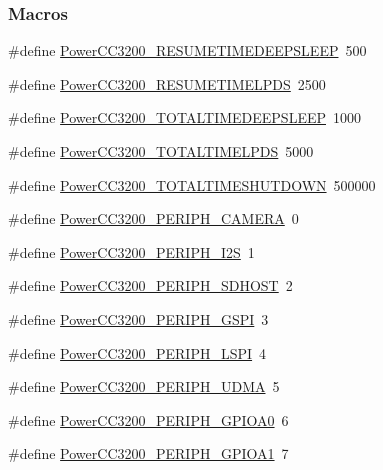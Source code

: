 \subsubsection*{Macros}
\begin{DoxyCompactItemize}
\item 
\#define \hyperlink{_power_c_c3200_8h_af67fc285dc9efcca6002ce2b002f392c}{Power\+C\+C3200\+\_\+\+R\+E\+S\+U\+M\+E\+T\+I\+M\+E\+D\+E\+E\+P\+S\+L\+E\+E\+P}~500
\item 
\#define \hyperlink{_power_c_c3200_8h_aa033c14a63825d7442fc5fbcd83795ac}{Power\+C\+C3200\+\_\+\+R\+E\+S\+U\+M\+E\+T\+I\+M\+E\+L\+P\+D\+S}~2500
\item 
\#define \hyperlink{_power_c_c3200_8h_aa5092dea7f375df244519c8f715ab845}{Power\+C\+C3200\+\_\+\+T\+O\+T\+A\+L\+T\+I\+M\+E\+D\+E\+E\+P\+S\+L\+E\+E\+P}~1000
\item 
\#define \hyperlink{_power_c_c3200_8h_a3d48420ba6c1504e6a7064f57f7a7146}{Power\+C\+C3200\+\_\+\+T\+O\+T\+A\+L\+T\+I\+M\+E\+L\+P\+D\+S}~5000
\item 
\#define \hyperlink{_power_c_c3200_8h_a58c317a571d1d049b9abb957a6a4f33e}{Power\+C\+C3200\+\_\+\+T\+O\+T\+A\+L\+T\+I\+M\+E\+S\+H\+U\+T\+D\+O\+W\+N}~500000
\item 
\#define \hyperlink{_power_c_c3200_8h_a3007ab90a06f6eda3698b8578dc0ce93}{Power\+C\+C3200\+\_\+\+P\+E\+R\+I\+P\+H\+\_\+\+C\+A\+M\+E\+R\+A}~0
\item 
\#define \hyperlink{_power_c_c3200_8h_a5094474db8fdd9b86f587d8ed2451ba6}{Power\+C\+C3200\+\_\+\+P\+E\+R\+I\+P\+H\+\_\+\+I2\+S}~1
\item 
\#define \hyperlink{_power_c_c3200_8h_ac7acff60b2adfcfa9fe975606f1cf383}{Power\+C\+C3200\+\_\+\+P\+E\+R\+I\+P\+H\+\_\+\+S\+D\+H\+O\+S\+T}~2
\item 
\#define \hyperlink{_power_c_c3200_8h_ae5a08454722475e27f5287b01e8c026a}{Power\+C\+C3200\+\_\+\+P\+E\+R\+I\+P\+H\+\_\+\+G\+S\+P\+I}~3
\item 
\#define \hyperlink{_power_c_c3200_8h_a989b70e48ff576ac1da5655905f9f198}{Power\+C\+C3200\+\_\+\+P\+E\+R\+I\+P\+H\+\_\+\+L\+S\+P\+I}~4
\item 
\#define \hyperlink{_power_c_c3200_8h_a053256ced317ea2bd0fc0263f9d608d0}{Power\+C\+C3200\+\_\+\+P\+E\+R\+I\+P\+H\+\_\+\+U\+D\+M\+A}~5
\item 
\#define \hyperlink{_power_c_c3200_8h_ad2c503e5d3bf7957213cf418246d4a2e}{Power\+C\+C3200\+\_\+\+P\+E\+R\+I\+P\+H\+\_\+\+G\+P\+I\+O\+A0}~6
\item 
\#define \hyperlink{_power_c_c3200_8h_a558e2586f8ece5e9151b1fc9edf7d3ba}{Power\+C\+C3200\+\_\+\+P\+E\+R\+I\+P\+H\+\_\+\+G\+P\+I\+O\+A1}~7

\end{DoxyCompactItemize}
